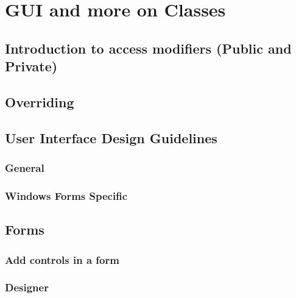 \documentclass[
]{book}
\begin{document}
\hypertarget{gui-and-more-on-classes}{%
\chapter{GUI and more on Classes}\label{gui-and-more-on-classes}}

\hypertarget{introduction-to-access-modifiers-public-and-private}{%
\section{Introduction to access modifiers (Public and Private)}\label{introduction-to-access-modifiers-public-and-private}}

\hypertarget{overriding}{%
\section{Overriding}\label{overriding}}

\hypertarget{user-interface-design-guidelines}{%
\section{User Interface Design Guidelines}\label{user-interface-design-guidelines}}

\hypertarget{general}{%
\subsection{General}\label{general}}

\hypertarget{windows-forms-specific}{%
\subsection{Windows Forms Specific}\label{windows-forms-specific}}

\hypertarget{forms}{%
\section{Forms}\label{forms}}

\hypertarget{add-controls-in-a-form}{%
\subsection{Add controls in a form}\label{add-controls-in-a-form}}

\hypertarget{designer}{%
\subsection{Designer}\label{designer}}
\end{document}
